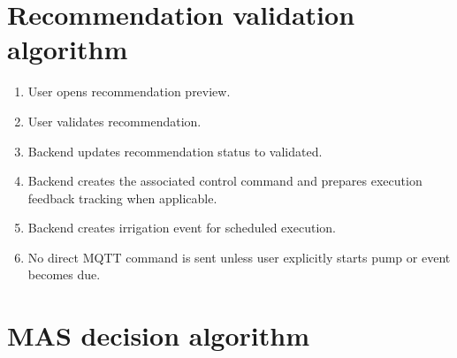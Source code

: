 \section{Recommendation validation algorithm}

\begin{enumerate}

\item User opens recommendation preview.

\item User validates recommendation.

\item Backend updates recommendation status to validated.

\item Backend creates the associated control command and prepares execution feedback tracking when applicable.

\item Backend creates irrigation event for scheduled execution.

\item No direct MQTT command is sent unless user explicitly starts pump or event becomes due.

\end{enumerate}

\section{MAS decision algorithm}

